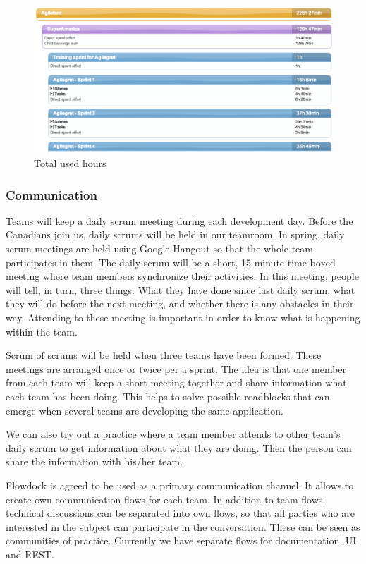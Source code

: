 \begin{figure}[H]
\centering
\includegraphics[width=1\textwidth]{imgs/totalhours.png}
\caption{Total used hours}
\label{fig:totalhours}
\end{figure}

\subsubsection{Communication}

Teams will keep a daily scrum meeting during each development day. Before the
Canadians join us, daily scrums will be held in our teamroom. In spring, daily
scrum meetings are held using Google Hangout so that the whole team participates
in them. The daily scrum will be a short, 15-minute time-boxed meeting where
team members synchronize their activities. In this meeting, people will tell, in
turn, three things: What they have done since last daily scrum, what they will
do before the next meeting, and whether there is any obstacles in their way.
Attending to these meeting is important in order to know what is happening
within the team.

Scrum of scrums will be held when three teams have been formed. These meetings
are arranged once or twice per a sprint. The idea is that one member from each team
will keep a short meeting together and share information what each team has been
doing. This helps to solve possible roadblocks that can emerge when several
teams are developing the same application.

We can also try out a practice where a team member attends to other team's daily
scrum to get information about what they are doing. Then the person can share
the information with his/her team.

Flowdock is agreed to be used as a primary communication channel. It allows to
create own communication flows for each team. In addition to team flows,
technical discussions can be separated into own flows, so that all parties who
are interested in the subject can participate in the conversation. These can be
seen as communities of practice. Currently we have separate flows for
documentation, UI and REST.

